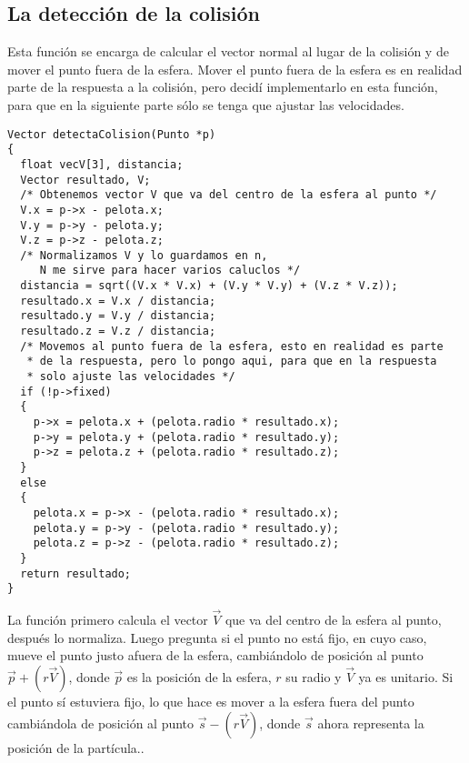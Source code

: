 \subsection{La detección de la colisión}
Esta función se encarga de calcular el vector normal al lugar de la colisión y de mover el punto fuera de la esfera. Mover el punto fuera de la esfera es en realidad parte de la respuesta a la colisión, pero decidí implementarlo en esta función, para que en la siguiente parte sólo se tenga que ajustar las velocidades.
\begin{verbatim}
Vector detectaColision(Punto *p)
{
  float vecV[3], distancia;
  Vector resultado, V;
  /* Obtenemos vector V que va del centro de la esfera al punto */
  V.x = p->x - pelota.x;
  V.y = p->y - pelota.y;
  V.z = p->z - pelota.z;
  /* Normalizamos V y lo guardamos en n, 
     N me sirve para hacer varios caluclos */
  distancia = sqrt((V.x * V.x) + (V.y * V.y) + (V.z * V.z));
  resultado.x = V.x / distancia;
  resultado.y = V.y / distancia;
  resultado.z = V.z / distancia;
  /* Movemos al punto fuera de la esfera, esto en realidad es parte 
   * de la respuesta, pero lo pongo aqui, para que en la respuesta 
   * solo ajuste las velocidades */
  if (!p->fixed)
  {
    p->x = pelota.x + (pelota.radio * resultado.x);
    p->y = pelota.y + (pelota.radio * resultado.y);
    p->z = pelota.z + (pelota.radio * resultado.z);	
  }
  else
  {
    pelota.x = p->x - (pelota.radio * resultado.x);
    pelota.y = p->y - (pelota.radio * resultado.y);
    pelota.z = p->z - (pelota.radio * resultado.z);
  }
  return resultado;
}
\end{verbatim} 
La función primero calcula el vector $\vec{V}$ que va del centro de la esfera al punto, después lo normaliza. Luego pregunta si el punto no está fijo, en cuyo caso, mueve el punto justo afuera de la esfera, cambiándolo de posición al punto $\vec{p} + (r\vec{V})$, donde $\vec{p}$ es la posición de la esfera, $r$ su radio y $\vec{V}$ ya es unitario. Si el punto sí estuviera fijo, lo que hace es mover a la esfera fuera del punto cambiándola de posición al punto $\vec{s} - (r\vec{V})$, donde $\vec{s}$ ahora representa la posición de la partícula..

